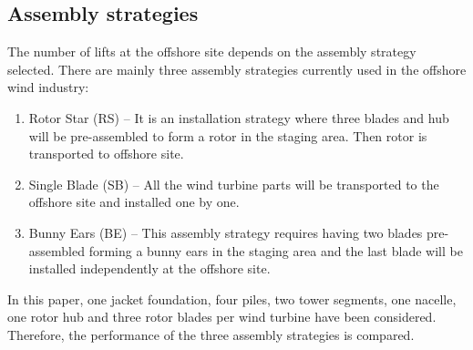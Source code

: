 \subsection{Assembly strategies}
The number of lifts at the offshore site depends on the assembly strategy selected. There are mainly three assembly strategies currently used in the offshore wind industry:

\begin{enumerate}
\item Rotor Star (RS) -- It is an installation strategy where three blades and hub will be pre-assembled to form a rotor in the staging area. Then rotor is transported to offshore site.
\item Single Blade (SB) -- All the wind turbine parts will be transported to the offshore site and installed one by one.
\item Bunny Ears (BE) -- This assembly strategy requires having two blades pre-assembled forming a bunny ears in the staging area and the last blade will be installed independently at the offshore site.
\end{enumerate}

In this paper, one jacket foundation, four piles, two tower segments, one nacelle, one rotor hub and three rotor blades per wind turbine have been considered. Therefore, the performance of the three assembly strategies is compared.